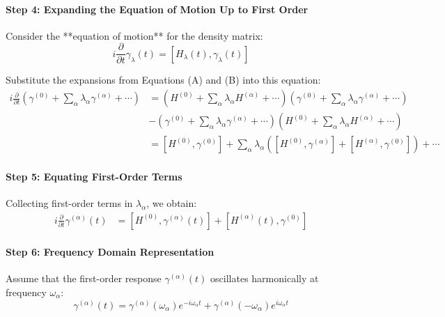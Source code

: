 \paragraph{Step 4: Expanding the Equation of Motion Up to First Order}

Consider the **equation of motion** for the density matrix:
\begin{equation}
i \frac{\partial}{\partial t} \gamma_{\lambda}(t) = [H_{\lambda}(t), \gamma_{\lambda}(t)] 
\end{equation}

Substitute the expansions from Equations (A) and (B) into this equation:
\begin{align}
i \frac{\partial}{\partial t} \left( \gamma^{(0)} + \sum_{\alpha} \lambda_{\alpha} \gamma^{(\alpha)} + \cdots \right) &= \left( H^{(0)} + \sum_{\alpha} \lambda_{\alpha} H^{(\alpha)} + \cdots \right) \left( \gamma^{(0)} + \sum_{\alpha} \lambda_{\alpha} \gamma^{(\alpha)} + \cdots \right) \nonumber \\
&- \left( \gamma^{(0)} + \sum_{\alpha} \lambda_{\alpha} \gamma^{(\alpha)} + \cdots \right) \left( H^{(0)} + \sum_{\alpha} \lambda_{\alpha} H^{(\alpha)} + \cdots \right) \nonumber \\
&= [H^{(0)}, \gamma^{(0)}] + \sum_{\alpha} \lambda_{\alpha} \left( [H^{(0)}, \gamma^{(\alpha)}] + [H^{(\alpha)}, \gamma^{(0)}] \right) + \cdots \end{align}

\paragraph{Step 5: Equating First-Order Terms}

Collecting first-order terms in \( \lambda_{\alpha} \), we obtain:
\begin{align}
i \frac{\partial}{\partial t} \gamma^{(\alpha)}(t) &= [H^{(0)}, \gamma^{(\alpha)}(t)] + [H^{(\alpha)}(t), \gamma^{(0)}] \end{align}

\paragraph{Step 6: Frequency Domain Representation}

Assume that the first-order response \( \gamma^{(\alpha)}(t) \) oscillates harmonically at frequency \( \omega_{\alpha} \):
\begin{equation}
\gamma^{(\alpha)}(t) = \gamma^{(\alpha)}(\omega_{\alpha}) e^{-i \omega_{\alpha} t} + \gamma^{(\alpha)}(-\omega_{\alpha}) e^{i \omega_{\alpha} t} \end{equation}

